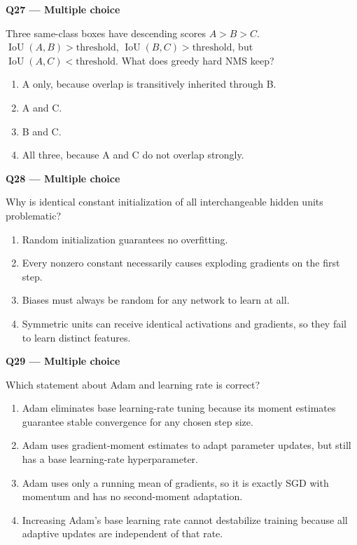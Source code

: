 \documentclass[11pt,a4paper]{article}
\begin{document}
\par\vspace{12pt}
\begin{minipage}{\linewidth}
\textbf{Q27 — Multiple choice}\par\smallskip
Three same-class boxes have descending scores \(A>B>C\). \(\operatorname{IoU}(A,B)>\text{threshold}\),\allowbreak{} \(\operatorname{IoU}(B,C)>\text{threshold}\),\allowbreak{} but \(\operatorname{IoU}(A,C)<\text{threshold}\). What does greedy hard NMS keep?
\begin{enumerate}[label=\textbf{\Alph*.}]
\item A only,\allowbreak{} because overlap is transitively inherited through B.
\item A and C.
\item B and C.
\item All three,\allowbreak{} because A and C do not overlap strongly.
\end{enumerate}
\end{minipage}
\par\vspace{12pt}
\begin{minipage}{\linewidth}
\textbf{Q28 — Multiple choice}\par\smallskip
Why is identical constant initialization of all interchangeable hidden units problematic?
\begin{enumerate}[label=\textbf{\Alph*.}]
\item Random initialization guarantees no overfitting.
\item Every nonzero constant necessarily causes exploding gradients on the first step.
\item Biases must always be random for any network to learn at all.
\item Symmetric units can receive identical activations and gradients,\allowbreak{} so they fail to learn distinct features.
\end{enumerate}
\end{minipage}
\par\vspace{12pt}
\begin{minipage}{\linewidth}
\textbf{Q29 — Multiple choice}\par\smallskip
Which statement about Adam and learning rate is correct?
\begin{enumerate}[label=\textbf{\Alph*.}]
\item Adam eliminates base learning-rate tuning because its moment estimates guarantee stable convergence for any chosen step size.
\item Adam uses gradient-moment estimates to adapt parameter updates,\allowbreak{} but still has a base learning-rate hyperparameter.
\item Adam uses only a running mean of gradients,\allowbreak{} so it is exactly SGD with momentum and has no second-moment adaptation.
\item Increasing Adam's base learning rate cannot destabilize training because all adaptive updates are independent of that rate.
\end{enumerate}
\end{minipage}
\end{document}
